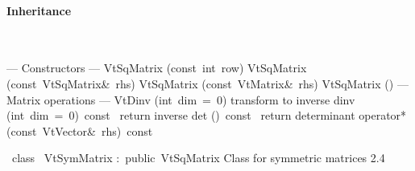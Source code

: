 \documentclass{article}
\begin{document}
\begin{cxxentry}
\begin{cxxclass}
\begin{cxxInheritance}
\paragraph{Inheritance}\strut\smallskip\strut\\
\end{cxxInheritance}
\begin{cxxpublic}
\cxxitem{}
        {--- Constructors --- }
        {}
        {}
        {}
\label{cxx.2.3.1}
\cxxitem{}
        {VtSqMatrix}
        {(const\ int\ row)}
        {}
        {}
\label{cxx.2.3.2}
\cxxitem{}
        {VtSqMatrix}
        {(const\ VtSqMatrix\&\ rhs)}
        {}
        {}
\label{cxx.2.3.3}
\cxxitem{}
        {VtSqMatrix}
        {(const\ VtMatrix\&\ rhs)}
        {}
        {}
\label{cxx.2.3.4}
        {\cxxtilde VtSqMatrix}
        {()}
        {}
        {}
\label{cxx.2.3.5}
\cxxitem{}
        {--- Matrix operations --- }
        {}
        {}
        {}
\label{cxx.2.3.6}
        {VtDinv}
        {(int\ dim\ =\ 0)}
        { transform to inverse}
        {}
\label{cxx.2.3.7}
        {dinv}
        {(int\ dim\ =\ 0)\ const\ }
        { return inverse}
        {}
\label{cxx.2.3.8}
        {det}
        {()\ const\ }
        { return determinant}
        {}
\label{cxx.2.3.9}
        {operator*}
        {(const\ VtVector\&\ rhs)\ const\ }
        {}
        {}
\label{cxx.2.3.10}
\end{cxxpublic}
\end{cxxclass}
\begin{cxxclass}
{\ class\ }
        {VtSymMatrix}
        {:\ public\ VtSqMatrix}
        {Class for symmetric matrices}
        {2.4}
\begin{cxxInheritance}

\end{cxxInheritance}
\end{cxxclass}
\end{cxxentry}
\end{document}
